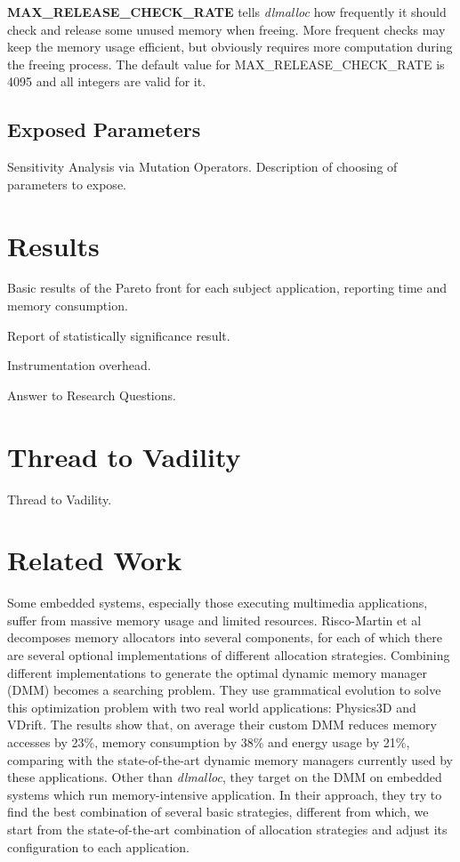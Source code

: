 \documentclass{acm_proc_article-sp}
\begin{document}
\textbf{MAX\_RELEASE\_CHECK\_RATE} tells \emph{dlmalloc} how frequently it should check and release some unused memory when freeing. More frequent checks may keep the memory usage efficient, but obviously requires more computation during the freeing process. The default value for MAX\_RELEASE\_CHECK\_RATE is 4095 and all integers are valid for it. 
\subsection{Exposed Parameters}
Sensitivity Analysis via Mutation Operators. Description of choosing of parameters to expose.

\section{Results}
Basic results of the Pareto front for each subject application, reporting time and memory consumption.

Report of statistically significance result.

Instrumentation overhead.

Answer to Research Questions.

\section{Thread to Vadility}
Thread to Vadility.

\section{Related Work}

Some embedded systems, especially those executing multimedia applications, suffer from massive memory usage and limited resources. Risco-Martin et al\cite{Risco-Martin:2009:ODM:1569901.1570116}\cite{RiscoMartin2010572} decomposes memory allocators into several components, for each of which there are several optional implementations of different allocation strategies. Combining different implementations to generate the optimal dynamic memory manager (DMM) becomes a searching problem. They use grammatical evolution to solve this optimization problem with two real world applications: Physics3D and VDrift. The results show that, on average their custom DMM reduces memory accesses by 23\%, memory consumption by 38\% and energy usage by 21\%, comparing with the state-of-the-art dynamic memory managers currently used by these applications. Other than \emph{dlmalloc}, they target on the DMM on embedded systems which run memory-intensive application. In their approach, they try to find the best combination of several basic strategies, different from which, we start from the state-of-the-art combination of allocation strategies and adjust its configuration to each application. 
\end{document}
